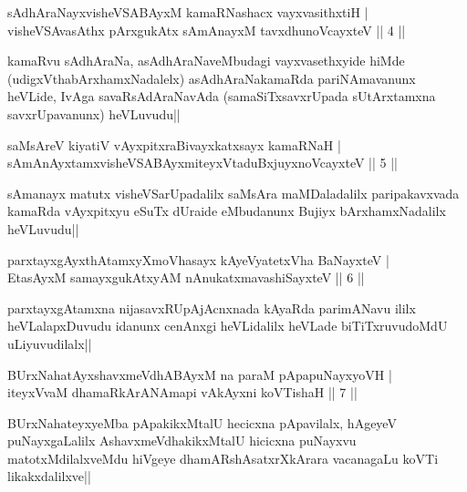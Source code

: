 \begin{shl}
sAdhAraNayxvisheVSABAyxM kamaRNashacx vayxvasithxtiH |\\
visheVSAvasAthx pArxgukAtx sAmAnayxM tavxdhunoVcayxteV \hfill || 4 ||
\end{shl}

\begin{artha}
kamaRvu sAdhAraNa, asAdhAraNaveMbudagi vayxvasethxyide hiMde (udigxVthabArxhamxNadalelx) asAdhAraNakamaRda pariNAmavanunx heVLide, IvAga savaRsAdAraNavAda (samaSiTxsavxrUpada sUtArxtamxna savxrUpavanunx) heVLuvudu||
\end{artha}


\begin{shl}
saMsAreV kiyatiV vAyxpitxraBivayxkatxsayx kamaRNaH |\\
sAmAnAyxtamxvisheVSABAyxmiteyxVtaduBxjuyxnoVcayxteV \hfill || 5 ||
\end{shl}

\begin{artha}
sAmanayx matutx visheVSarUpadalilx saMsAra maMDaladalilx paripakavxvada kamaRda vAyxpitxyu eSuTx dUraide eMbudanunx Bujiyx bArxhamxNadalilx heVLuvudu||
\end{artha}

\begin{shl}
parxtayxgAyxthAtamxyXmoVhasayx kAyeVyatetxVha BaNayxteV |\\
EtasAyxM samayxgukAtxyAM nAnukatxmavashiSayxteV \hfill || 6 ||
\end{shl}

\begin{artha}
parxtayxgAtamxna nijasavxRUpAjAcnxnada kAyaRda parimANavu ililx heVLalapxDuvudu idanunx cenAnxgi heVLidalilx heVLade biTiTxruvudoMdU uLiyuvudilalx||
\end{artha}


\begin{shl}
BUrxNahatAyxshavxmeVdhABAyxM na paraM pApapuNayxyoVH |\\
iteyxVvaM dhamaRkArANAmapi vAkAyxni koVTishaH \hfill || 7 ||
\end{shl}

\begin{artha}
BUrxNahateyxyeMba pApakikxMtalU hecicxna pApavilalx, hAgeyeV puNayxgaLalilx AshavxmeVdhakikxMtalU hicicxna puNayxvu matotxMdilalxveMdu hiVgeye dhamARshAsatxrXkArara vacanagaLu koVTi likakxdalilxve||
\end{artha}

